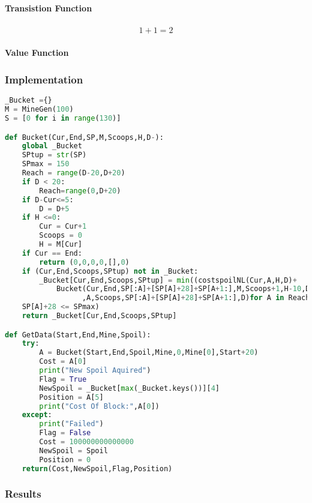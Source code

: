 \paragraph*{Transistion Function}
\begin{align}
\label{Transition}
1+1=2
\end{align}
\paragraph*{Value Function}
\subsubsection{Implementation}
\begin{lstlisting}[language=python]
_Bucket ={}
M = MineGen(100)
S = [0 for i in range(130)]

def Bucket(Cur,End,SP,M,Scoops,H,D-):
    global _Bucket
    SPtup = str(SP)
    SPmax = 150
    Reach = range(D-20,D+20) 
    if D < 20:
        Reach=range(0,D+20) 
    if D-Cur<=5:
        D = D+5
    if H <=0:
        Cur = Cur+1
        Scoops = 0
        H = M[Cur]
    if Cur == End:
        return (0,0,0,0,[],0)
    if (Cur,End,Scoops,SPtup) not in _Bucket:
        _Bucket[Cur,End,Scoops,SPtup] = min((costspoilNL(Cur,A,H,D)+
            Bucket(Cur,End,SP[:A]+[SP[A]+28]+SP[A+1:],M,Scoops+1,H-10,D)[0],Cur\
                  ,A,Scoops,SP[:A]+[SP[A]+28]+SP[A+1:],D)for A in Reach if\
    SP[A]+28 <= SPmax)
    return _Bucket[Cur,End,Scoops,SPtup]

def GetData(Start,End,Mine,Spoil):
    try:
        A = Bucket(Start,End,Spoil,Mine,0,Mine[0],Start+20)
        Cost = A[0]        
        print("New Spoil Aquired")
        Flag = True
        NewSpoil = _Bucket[max(_Bucket.keys())][4]
        Position = A[5]
        print("Cost Of Block:",A[0])
    except:
        print("Failed")
        Flag = False
        Cost = 100000000000000
        NewSpoil = Spoil
        Position = 0
    return(Cost,NewSpoil,Flag,Position)

\end{lstlisting}
\subsubsection{Results}



